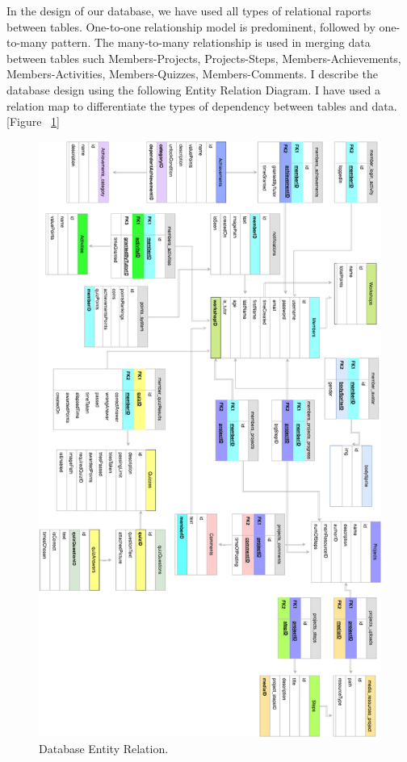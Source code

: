 In the design of our database, we have used all types of relational raports between tables. One-to-one relationship model is predominent, followed by one-to-many pattern. 
The many-to-many relationship is used in merging data between tables such Members-Projects, Projects-Steps, Members-Achievements, Members-Activities, Members-Quizzes, Members-Comments.
I describe the database design using the following Entity Relation Diagram. I have used a  relation map to differentiate the types of dependency between tables and data.
[Figure ~\ref{fig:entity_relation}]\\


\begin{figure}
\includegraphics[width=1\linewidth]{images/EntityRelation.png}
\caption{Database Entity Relation.}
\label{fig:entity_relation}
\end{figure}


